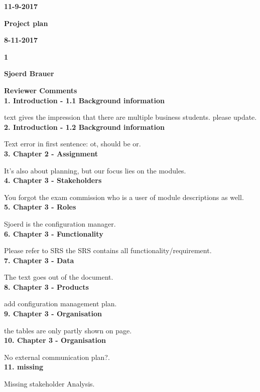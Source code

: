 \documentclass{report}
\begin{document}
\textbf{11-9-2017}


\textbf{Project plan}


\textbf{8-11-2017}


\textbf{1}


\textbf{Sjoerd Brauer}



\textbf{Reviewer Comments}\\



\textbf{1. Introduction - 1.1 Background information}

text gives the impression that there are multiple business students. please update.\\

\textbf{2. Introduction - 1.2 Background information}

Text error in first sentence: ot, should be or.\\

\textbf{3. Chapter 2 - Assignment}

It's also about planning, but our focus lies on the modules.\\

\textbf{4. Chapter 3 - Stakeholders}

You forgot the exam commission who is a user of module descriptions as well.\\

\textbf{5. Chapter 3 - Roles}

Sjoerd is the configuration manager.\\

\textbf{6. Chapter 3 - Functionality}

Please refer to SRS the SRS contains all functionality/requirement.\\

\textbf{7. Chapter 3 - Data}

The text goes out of the document.\\

\textbf{8. Chapter 3 - Products}

add configuration management plan.\\

\textbf{9. Chapter 3 - Organisation}

the tables are only partly shown on page.\\

\textbf{10. Chapter 3 - Organisation}

No external communication plan?.\\

\textbf{11. missing}

Missing stakeholder Analysis.\\
\end{document}
